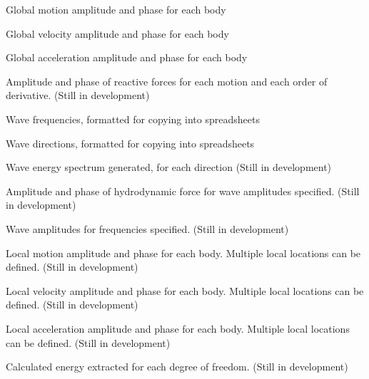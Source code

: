 \begin{DoxyItemize}
\item Global motion amplitude and phase for each body
\item Global velocity amplitude and phase for each body
\item Global acceleration amplitude and phase for each body
\item Amplitude and phase of reactive forces for each motion and each order of derivative. (Still in development)
\item Wave frequencies, formatted for copying into spreadsheets
\item Wave directions, formatted for copying into spreadsheets
\item Wave energy spectrum generated, for each direction (Still in development)
\item Amplitude and phase of hydrodynamic force for wave amplitudes specified. (Still in development)
\item Wave amplitudes for frequencies specified. (Still in development)
\item Local motion amplitude and phase for each body. Multiple local locations can be defined. (Still in development)
\item Local velocity amplitude and phase for each body. Multiple local locations can be defined. (Still in development)
\item Local acceleration amplitude and phase for each body. Multiple local locations can be defined. (Still in development)
\item Calculated energy extracted for each degree of freedom. (Still in development) 
\end{DoxyItemize}